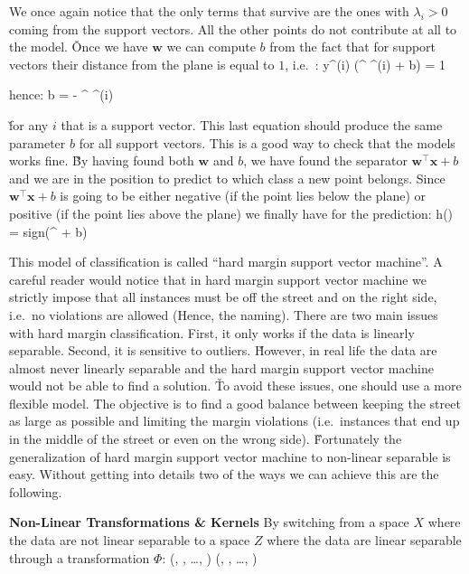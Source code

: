 We once again notice that the only terms that survive are the ones with $\lambda_{i} > 0$ coming from the support
vectors. All the other points do not contribute at all to the model. \v

Once we have $\boldsymbol{w}$ we can compute $b$ from the fact that for support vectors their distance from the plane
is equal to $1$, i.e.\ :
\bse
y^{(i)} (^{\intercal} ^{(i)} + b) = 1
\ese

hence:
\bse
b =  - ^{\intercal} ^{(i)}
\ese

\v

for any $i$ that is a support vector. This last equation should produce the same parameter $b$ for all support
vectors. This is a good way to check that the models works fine. \v

By having found both $\boldsymbol{w}$ and $b$, we have found the separator $\boldsymbol{w}^{\intercal} \boldsymbol{x}
+ b$ and we are in the position to predict to which class a new point belongs. Since $\boldsymbol{w}^{\intercal}
\boldsymbol{x} + b$ is going to be either negative (if the point lies below the plane) or positive (if the point lies
above the plane) we finally have for the prediction:
\bse
h() = sign(^{\intercal}  + b)
\ese

This model of classification is called ``hard margin support vector machine''. A careful reader would notice that
in hard margin support vector machine we strictly impose that all instances must be off the street and on the right
side, i.e.\ no violations are allowed (Hence, the naming). There are two main issues with hard margin classification.
First, it only works if the data is linearly separable. Second, it is sensitive to outliers. \v

However, in real life the data are almost never linearly separable and the hard margin support vector machine would
not be able to find a solution. \v

To avoid these issues, one should use a more flexible model. The objective is to find a good balance between keeping
the street as large as possible and limiting the margin violations (i.e.\ instances that end up in the middle of
the street or even on the wrong side). \v

Fortunately the generalization of hard margin support vector machine to non-linear separable is easy. Without getting
into details two of the ways we can achieve this are the following.
\bit
\item \textbf{Non-Linear Transformations \& Kernels} By switching from a space $X$ where the data are not linear
separable to a space $Z$ where the data are linear separable through a transformation $\Phi$:
\bse
(, , \ldots, ) \xrightarrow{\Phi}{}
(, , \ldots, )
\ese

